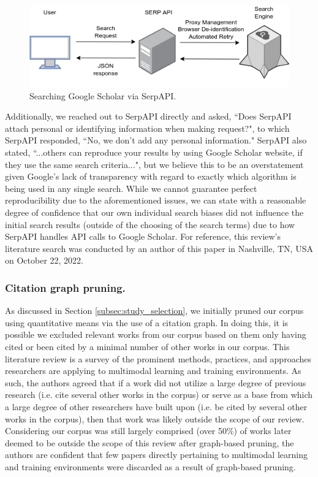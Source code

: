 \documentclass[manuscript,screen,review]{acmart}
\begin{document}
\begin{figure}
    \includegraphics[width=\textwidth]{img/SERP_API_diagram.drawio.png}
    \caption{Searching Google Scholar via SerpAPI.}
    \label{fig:serpAPI}
\end{figure}

Additionally, we reached out to SerpAPI directly and asked, ``Does SerpAPI attach personal or identifying information when making request?", to which SerpAPI responded, ``No, we don't add any personal information." SerpAPI also stated, ``...others can reproduce your results by using Google Scholar website, if they use the same search criteria...", but we believe this to be an overstatement given Google's lack of transparency with regard to exactly which algorithm is being used in any single search. While we cannot guarantee perfect reproducibility due to the aforementioned issues, we can state with a reasonable degree of confidence that our own individual search biases did not influence the initial search results (outside of the choosing of the search terms) due to how SerpAPI handles API calls to Google Scholar. For reference, this review's literature search was conducted by an author of this paper in Nashville, TN, USA on October 22, 2022.

\subsubsection{Citation graph pruning.} 

As discussed in Section \ref{subsec:study_selection}, we initially pruned our corpus using quantitative means via the use of a citation graph. In doing this, it is possible we excluded relevant works from our corpus based on them only having cited or been cited by a minimal number of other works in our corpus. This literature review is a survey of the prominent methods, practices, and approaches researchers are applying to multimodal learning and training environments. As such, the authors agreed that if a work did not utilize a large degree of previous research (i.e. cite several other works in the corpus) or serve as a base from which a large degree of other researchers have built upon (i.e. be cited by several other works in the corpus), then that work was likely outside the scope of our review. Considering our corpus was still largely comprised (over 50\%) of works later deemed to be outside the scope of this review after graph-based pruning, the authors are confident that few papers directly pertaining to multimodal learning and training environments were discarded as a result of graph-based pruning.
\end{document}
